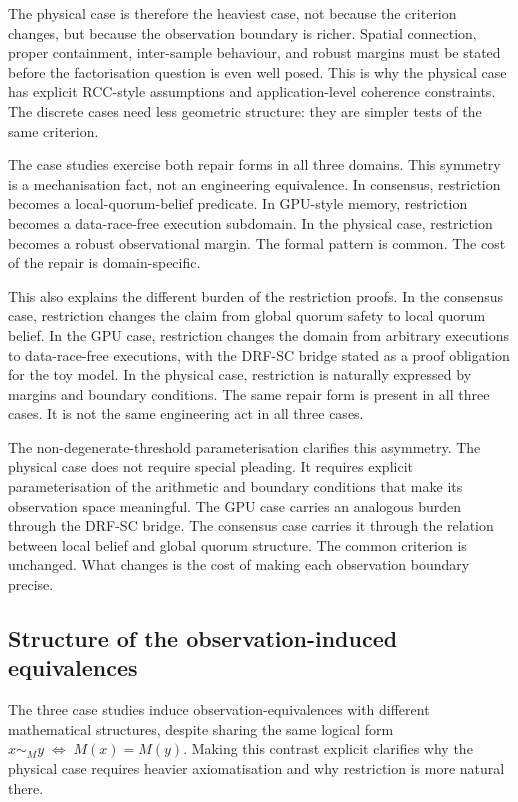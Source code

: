 \documentclass[a4paper,11pt]{article}
\begin{document}
The physical case is therefore the heaviest case, not because the criterion
changes, but because the observation boundary is richer. Spatial connection,
proper containment, inter-sample behaviour, and robust margins must be stated
before the factorisation question is even well posed. This is why the physical
case has explicit RCC-style assumptions and application-level coherence
constraints. The discrete cases need less geometric structure: they are simpler tests
of the same criterion.

The case studies exercise both repair forms in all three domains. This
symmetry is a mechanisation fact, not an engineering equivalence. In consensus,
restriction becomes a local-quorum-belief predicate. In GPU-style memory,
restriction becomes a data-race-free execution subdomain. In the physical case,
restriction becomes a robust observational margin. The formal pattern is common.
The cost of the repair is domain-specific.

This also explains the different burden of the restriction proofs. In the
consensus case, restriction changes the claim from global quorum safety to local
quorum belief. In the GPU case, restriction changes the domain from arbitrary
executions to data-race-free executions, with the DRF-SC bridge stated as a
proof obligation for the toy model. In the physical case, restriction is
naturally expressed by margins and boundary conditions. The same repair form is
present in all three cases. It is not the same engineering act in all three
cases.

The non-degenerate-threshold parameterisation clarifies this asymmetry.  The
physical case does not require special pleading.  It requires explicit
parameterisation of the arithmetic and boundary conditions that make its
observation space meaningful.  The GPU case carries an analogous burden
through the DRF-SC bridge.  The consensus case carries it through the
relation between local belief and global quorum structure.  The common
criterion is unchanged.  What changes is the cost of making each observation
boundary precise.

\subsection{Structure of the observation-induced equivalences}
\label{subsec:equivalence-structure}

The three case studies induce observation-equivalences with different
mathematical structures, despite sharing the same logical form
\(x \sim_M y \;\Leftrightarrow\; M(x)=M(y)\). Making this contrast explicit
clarifies why the physical case requires heavier axiomatisation and why
restriction is more natural there.
\end{document}
